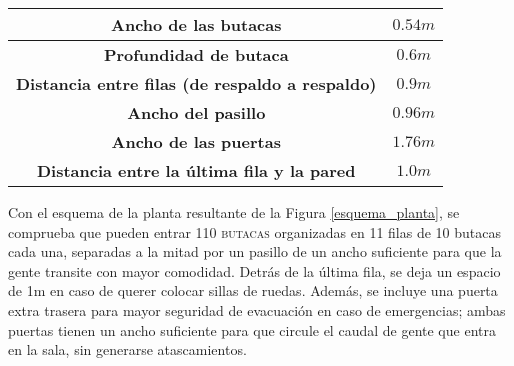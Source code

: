 		\begin{table}[h!]
			\centering
			\begin{tabular}{c c}
			\toprule
			\textbf{Ancho de las butacas} & \textbf{$0.54m$}\\
			\midrule
			\textbf{Profundidad de butaca} & \textbf{$0.6m$}\\
			\midrule
			\textbf{Distancia entre filas (de respaldo a respaldo)} & \textbf{$0.9m$}\\
			\midrule
			\textbf{Ancho del pasillo} & \textbf{$0.96m$}\\
			\midrule
			\textbf{Ancho de las puertas} & \textbf{$1.76m$}\\
			\midrule
			\textbf{Distancia entre la última fila y la pared} & \textbf{$1.0m$}\\
			\bottomrule
			\end{tabular}
		\end{table}

Con el esquema de la planta resultante de la Figura \ref{esquema_planta}, se comprueba que pueden entrar \textsc{110 butacas} organizadas en 11 filas de 10 butacas cada una, separadas a la mitad por un pasillo de un ancho suficiente para que la gente transite con mayor comodidad. Detrás de la última fila, se deja un espacio de 1m en caso de querer colocar sillas de ruedas. Además, se incluye una puerta extra trasera para mayor seguridad de evacuación en caso de emergencias; ambas puertas tienen un ancho suficiente para que circule el caudal de gente que entra en la sala, sin generarse atascamientos.\\


